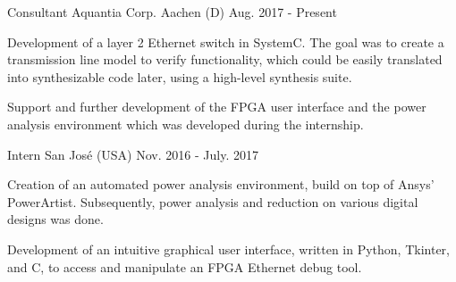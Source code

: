 \begin{cventries}
  \cventrydouble
    {Consultant} %
    {Aquantia Corp.} %
    {Aachen (D)} %
    {Aug. 2017 - Present} %
    {
      \begin{cvitems} %
        \item {Development of a layer 2 Ethernet switch in SystemC. The goal was to create a transmission line model to verify functionality, which could be easily translated into synthesizable code later, using a high-level synthesis suite.}
        \item {Support and further development of the FPGA user interface and the power analysis environment which was developed during the internship.}
      \end{cvitems}
    }
    {Intern} %
    {San José (USA)} %
    {Nov. 2016 - July. 2017} %
    {
      \begin{cvitems} %
        \item {Creation of an automated power analysis environment, build on top of Ansys' PowerArtist. Subsequently, power analysis and reduction on various digital designs was done.}
        \item {Development of an intuitive graphical user interface, written in Python, Tkinter, and C, to access and manipulate an FPGA Ethernet debug tool.}
      \end{cvitems}
    }



\end{cventries}
